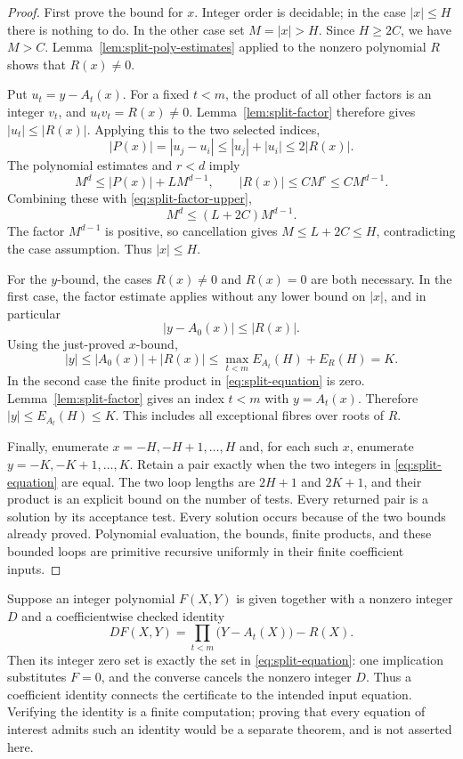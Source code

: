 \begin{proof}
First prove the bound for \(x\).  Integer order is decidable; in the
case \(|x|\leq H\) there is nothing to do.  In the other case set
\(M=|x|>H\).  Since \(H\geq2C\), we have \(M>C\).
Lemma~\ref{lem:split-poly-estimates} applied to the nonzero
polynomial \(R\) shows that \(R(x)\ne0\).

Put \(u_t=y-A_t(x)\).  For a fixed \(t<m\), the product of all
other factors is an integer \(v_t\), and
\(u_tv_t=R(x)\ne0\).  Lemma~\ref{lem:split-factor} therefore gives
\( |u_t|\leq|R(x)|\).  Applying this to the two selected indices,
\begin{equation}
 |P(x)|=|u_j-u_i|
       \leq |u_j|+|u_i|\leq2|R(x)|.
 \label{eq:split-factor-upper}
\end{equation}
The polynomial estimates and \(r<d\) imply
\[
 M^d\leq |P(x)|+LM^{d-1},
 \qquad
 |R(x)|\leq CM^r\leq CM^{d-1}.
\]
Combining these with \eqref{eq:split-factor-upper},
\[
 M^d\leq (L+2C)M^{d-1}.
\]
The factor \(M^{d-1}\) is positive, so cancellation gives
\(M\leq L+2C\leq H\), contradicting the case assumption.
Thus \(|x|\leq H\).

For the \(y\)-bound, the cases \(R(x)\ne0\) and \(R(x)=0\)
are both necessary.  In the first case, the factor estimate applies
without any lower bound on \(|x|\), and in particular
\[
 |y-A_0(x)|\leq |R(x)|.
\]
Using the just-proved \(x\)-bound,
\[
 |y|\leq|A_0(x)|+|R(x)|
       \leq\max_{t<m}E_{A_t}(H)+E_R(H)=K.
\]
In the second case the finite product in
\eqref{eq:split-equation} is zero.
Lemma~\ref{lem:split-factor} gives an index \(t<m\) with
\(y=A_t(x)\).  Therefore
\( |y|\leq E_{A_t}(H)\leq K\).
This includes all exceptional fibres over roots of \(R\).

Finally, enumerate \(x=-H,-H+1,\ldots,H\) and, for each such \(x\),
enumerate \(y=-K,-K+1,\ldots,K\).  Retain a pair exactly when the
two integers in \eqref{eq:split-equation} are equal.  The two loop
lengths are \(2H+1\) and \(2K+1\), and their product is an explicit
bound on the number of tests.  Every returned pair is a solution by
its acceptance test.  Every solution occurs because of the two bounds
already proved.  Polynomial evaluation, the bounds, finite products,
and these bounded loops are primitive recursive uniformly in their
finite coefficient inputs.
\end{proof}

\begin{remark}
Suppose an integer polynomial \(F(X,Y)\) is given together with a
nonzero integer \(D\) and a coefficientwise checked identity
\[
 D F(X,Y)=\prod_{t<m}\bigl(Y-A_t(X)\bigr)-R(X).
\]
Then its integer zero set is exactly the set in
\eqref{eq:split-equation}: one implication substitutes \(F=0\),
and the converse cancels the nonzero integer \(D\).
Thus a coefficient identity connects the certificate to the intended
input equation.  Verifying the identity is a finite computation;
proving that every equation of interest admits such an identity would
be a separate theorem, and is not asserted here.
\end{remark}

